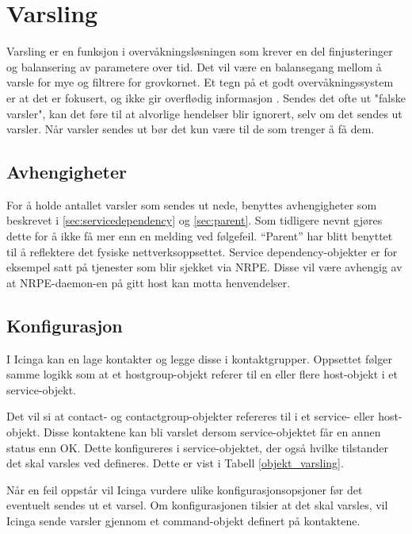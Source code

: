 \section{Varsling}
Varsling er en funksjon i overvåkningsløsningen som krever en del finjusteringer og balansering av parametere over tid. Det vil være en balansegang mellom å varsle for mye og filtrere for grovkornet. Et tegn på et godt overvåkningssystem er at det er fokusert, og ikke gir overflødig informasjon \cite{buildingnagiosmonitoring}. Sendes det ofte ut "falske varsler", kan det føre til at alvorlige hendelser blir ignorert, selv om det sendes ut varsler. Når varsler sendes ut bør det kun være til de som trenger å få dem.

\subsection{Avhengigheter}
For å holde antallet varsler som sendes ut nede, benyttes avhengigheter som beskrevet i \ref{sec:servicedependency}  og \ref{sec:parent}. Som tidligere nevnt gjøres dette for å ikke få mer enn en melding ved følgefeil. ``Parent'' har blitt benyttet til å reflektere det fysiske nettverksoppsettet. Service dependency-objekter er for eksempel satt på tjenester som blir sjekket via NRPE. Disse vil være avhengig av at NRPE-daemon-en på gitt host kan motta henvendelser.

\subsection{Konfigurasjon}
I Icinga kan en lage kontakter og legge disse i kontaktgrupper. Oppsettet følger samme logikk som at et hostgroup-objekt referer til en eller flere host-objekt i et service-objekt.

Det vil si at contact- og contactgroup-objekter refereres til i et service- eller host-objekt. Disse kontaktene kan bli varslet dersom service-objektet får en annen status enn OK. Dette konfigureres i service-objektet, der også hvilke tilstander det skal varsles ved defineres. Dette er vist i Tabell \ref{objekt_varsling}.

Når en feil oppstår vil Icinga vurdere ulike konfigurasjonsopsjoner før det eventuelt sendes ut et varsel. Om konfigurasjonen tilsier at det skal varsles, vil Icinga sende varsler gjennom et command-objekt definert på kontaktene. 


